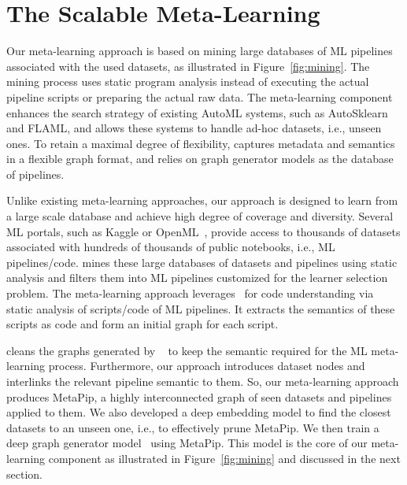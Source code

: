 \section{The {\sysname} Scalable Meta-Learning}
\label{sec:mining}

Our meta-learning approach is based on mining large databases of ML pipelines associated with the used datasets, as illustrated in Figure~\ref{fig:mining}. 
The mining process uses static program analysis instead of executing the actual pipeline scripts or preparing the actual raw data. The {\sysname} meta-learning component enhances the search strategy of existing AutoML systems, such as AutoSklearn and FLAML, and allows these systems to handle ad-hoc datasets, i.e., unseen ones. 
To retain a maximal degree of flexibility, {\sysname} captures metadata and semantics in a flexible graph format, and relies on graph generator models as the database of pipelines. 

Unlike existing meta-learning approaches, our approach is designed to learn from a large scale database and achieve high degree of coverage and diversity. Several ML portals, such as Kaggle or OpenML~\cite{OpenML}, provide access to thousands of datasets associated with hundreds of thousands of public notebooks, i.e., ML pipelines/code. 
{\sysname} mines these large databases of datasets and pipelines using static analysis and filters them into ML pipelines customized for the learner selection problem.
The {\sysname} meta-learning approach leverages~\cite{graph4code} for code understanding via static analysis of scripts/code of ML pipelines. It extracts the semantics of these scripts as code and form an initial graph for each script. 

{\sysname} cleans the graphs generated by ~\cite{graph4code} to keep the semantic required for the ML meta-learning process. Furthermore, our approach introduces dataset nodes and interlinks the relevant pipeline semantic to them. So, our meta-learning approach produces MetaPip, a highly interconnected graph of seen datasets and pipelines applied to them. We also developed a deep embedding model to find the closest datasets to an unseen one, i.e., to effectively prune MetaPip. We then train a deep graph generator model~\cite{deepgmg} using MetaPip. This model is the core of our meta-learning component as illustrated in Figure~\ref{fig:mining} and discussed in the next section.  
 

